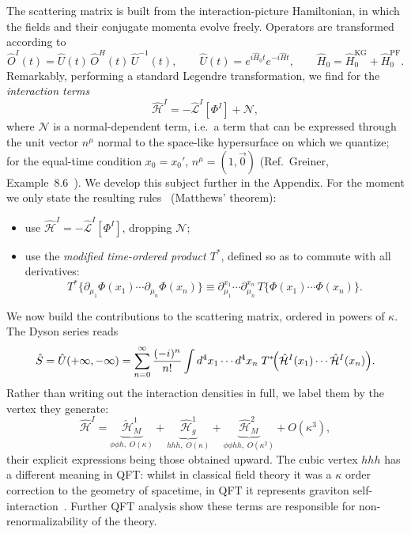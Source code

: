 \documentclass[12pt,a4paper,oneside]{article}
\numberwithin{equation}{section}   %
\begin{document}
The scattering matrix is built from the interaction-picture Hamiltonian, in
which the fields and their conjugate momenta evolve freely. Operators are
transformed according to
\begin{equation}
    \hat{O}^I(t)=\hat{U}(t)\,\hat{O}^H(t)\,\hat{U}^{-1}(t),\qquad
    \hat U(t)=e^{i\hat H_0t}e^{-i\hat Ht},\qquad
    \hat H_0=\hat H_0^{\mathrm{KG}}+\hat H_0^{\mathrm{PF}} .
\end{equation}
Remarkably, performing a standard Legendre transformation, we find for the
\textit{interaction terms}
\begin{equation}\label{HIN}
    \hat{\mathcal{H}}^I=-\hat{\mathcal{L}}^I[\Phi^I] + \mathcal{N},
\end{equation}
where $\mathcal{N}$ is a normal-dependent term, i.e.\ a term that can be
expressed through the unit vector $n^\mu$ normal to the space-like
hypersurface on which we quantize; for the equal-time condition $x_0=x_0'$,
$n^\mu=(1,\vec{0})$ (Ref.\ Greiner, Example~8.6~\cite{GreinerFQ}). We develop this subject
further in the Appendix. For the moment we only state the resulting rules~\cite{Weinberg1995}
(Matthews' theorem):
\begin{itemize}
    \item use $\hat{\mathcal{H}}^I=-\hat{\mathcal{L}}^I[\Phi^I]$, dropping $\mathcal{N}$;
    \item use the \textit{modified time-ordered product $T^*$}, defined so as to
    commute with all derivatives:
    \begin{equation}\label{Tstar}
        T^*\{\partial_{\mu_1}\Phi(x_1)\cdots\partial_{\mu_n}\Phi(x_n)\}
        \equiv \partial_{\mu_1}^{x_1}\cdots\partial_{\mu_n}^{x_n}\,
        T\{\Phi(x_1)\cdots\Phi(x_n)\} .
    \end{equation}
\end{itemize}

We now build the contributions to the scattering matrix, ordered in powers of
$\kappa$. The Dyson series reads
\begin{equation}\label{Dyson}
    \hat{S} = \hat{U}(+\infty,-\infty)
    = \sum_{n=0}^{\infty} \frac{(-i)^n}{n!}
    \int d^4x_1 \cdots d^4x_n\;
    T^*\!\Bigl(\hat{\mathcal{H}}^I(x_1)\cdots\hat{\mathcal{H}}^I(x_n)\Bigr).
\end{equation}
Rather than writing out the interaction densities in full, we label them by the
vertex they generate:
\begin{equation}\label{Hlabels}
\hat{\mathcal{H}}^I
=\underbrace{\hat{\mathcal{H}}_M^{1}}_{\phi\phi h,\;O(\kappa)}
+\underbrace{\hat{\mathcal{H}}_g^{1}}_{hhh,\;O(\kappa)}
+\underbrace{\hat{\mathcal{H}}_M^{2}}_{\phi\phi hh,\;O(\kappa^{2})}
+O(\kappa^{3}),
\end{equation}
their explicit expressions being those obtained upward. 
The cubic vertex $hhh$ has a different meaning 
in QFT:
whilst in classical field theory it was a 
$\kappa$ order correction to the geometry of spacetime,
in QFT it represents 
graviton
 self-interaction~\cite{Gupta1954,Feynman1963}. 
 Further QFT analysis show these terms are
 responsible for non-renormalizability of the theory.
\end{document}
